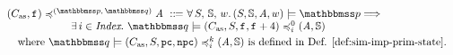 \begin{definition}
    \em
    \label{def:sim-impl-prim}
    \small
    \[
        \begin{array}{l}
            \simFunction{(\asmimp, \lab{})}
                {(\relastP, \, \relastQ)}{\primcom}
            \ \define \ 
            \forall \, \state, \, \hpstate, \, \word. \,      
            \asrtmodel{(\state, \hpstate, \primcom, \word)}{\relastP}
            \Longrightarrow \\
            \hspace*{6em}
            \exists \, i \in \Index. \ 
            \simFunctionSt{\relastQ}{(\asmimp, \state, \lab{}, \lab{}+4)}
                {i}{0}{(\primcom, \hpstate)} \\
            \\[-9pt]
            \hspace*{1em}
            \text{where } 
            \simFunctionSt{\relastQ}{(\asmimp, \state, \pc, \npc)}
                {i}{k}{(\primcom, \hpstate)}
            \TYPE{ is defined in 
            \Def{\ref{def:sim-imp-prim-state}}}.
        \end{array}
    \]
\end{definition}

